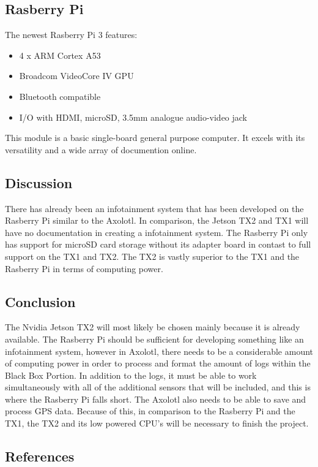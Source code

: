 \documentclass[onecolumn, draftclsnofoot,10pt, compsoc]{IEEEtran}
\begin{document}
\subsection{Rasberry Pi}
The newest Rasberry Pi 3 features:
\begin{itemize}
    \item 4 x ARM Cortex A53
    \item Broadcom VideoCore IV GPU
    \item Bluetooth compatible
    \item I/O with HDMI, microSD, 3.5mm analogue audio-video jack
\end{itemize}
This module is a basic single-board general purpose computer. It excels with its versatility and a wide array of documention online.
~\cite{rasberry:specs}

\subsection{Discussion}
There has already been an infotainment system that has been developed on the Rasberry Pi similar to the Axolotl. In comparison, the Jetson TX2 and TX1 will have no documentation in creating a infotainment system. 
The Rasberry Pi only has support for microSD card storage without its adapter board in contast to full support on the TX1 and TX2. 
The TX2 is vastly superior to the TX1 and the Rasberry Pi in terms of computing power. 

\subsection{Conclusion}
The Nvidia Jetson TX2 will most likely be chosen mainly because it is already available. The Rasberry Pi should be sufficient for developing something like an infotainment system, however in Axolotl, there needs to be a considerable amount of computing power in order to process and format the amount of logs within the Black Box Portion. In addition to the logs, it must be able to work simultaneously with all of the additional sensors that will be included, and this is where the Rasberry Pi falls short. The Axolotl also needs to be able to save and process GPS data. Because of this, in comparison to the Rasberry Pi and the TX1, the TX2 and its low powered CPU's will be necessary to finish the project.

\clearpage
\subsection{References}


\end{document}
